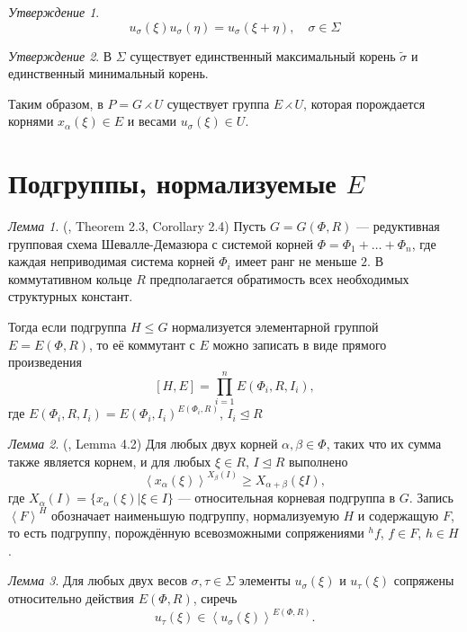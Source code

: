 \documentclass[10pt]{article}
\theoremstyle{remark}
\newtheorem{prop}{Утверждение}
\newtheorem{lm}{Лемма}
\renewcommand{\le}{\leqslant}
\renewcommand{\ge}{\geqslant}
\begin{document}
\begin{prop}
  $$ u_\sigma(\xi) u_\sigma(\eta) = u_\sigma(\xi + \eta), \quad \sigma \in \Sigma $$
\end{prop}

\begin{prop}
  В $\Sigma$ существует единственный максимальный корень $\widetilde{\sigma}$ и единственный минимальный корень.
\end{prop}

Таким образом, в $P = G \rightthreetimes U $ существует группа $E \rightthreetimes U$, которая порождается корнями $x_\alpha(\xi) \in E$ и весами $u_\sigma(\xi) \in U$.

\section{Подгруппы, нормализуемые $E$}

\begin{lm}(\citep{Stavrova2009}, Theorem 2.3, Corollary 2.4)
  \label{directproduct}
  Пусть $G = G(\Phi, R)$ --- редуктивная групповая схема Шевалле-Демазюра
  с системой корней $\Phi = \Phi_1 + \ldots + \Phi_n$, где каждая неприводимая система корней $\Phi_i$ имеет ранг не меньше $2$. В коммутативном кольце $R$ предполагается обратимость всех необходимых структурных констант.
  
  Тогда если подгруппа $H \le G$ нормализуется элементарной группой $E = E(\Phi,R)$, то её коммутант с $E$ можно записать в виде прямого произведения
  $$ [H, E] = \prod_{i=1}^n E(\Phi_i,R,I_i), $$
  где $E(\Phi_i,R,I_i) = E(\Phi_i,I_i)^{E(\Phi_i,R)}$, $I_i \trianglelefteq R$
\end{lm}

\begin{lm}(\citep{Stavrova2009}, Lemma 4.2)
  \label{transitivity}
  Для любых двух корней $\alpha, \beta \in \Phi$, таких что их сумма также является корнем, и для любых  $\xi \in R$, $I \trianglelefteq R$ выполнено
  $$ \left< x_\alpha(\xi) \right>^{X_\beta(I)} \ge X_{\alpha + \beta}(\xi I), $$  
  где $X_\alpha(I) = \{x_\alpha(\xi) | \xi \in I\}$ --- относительная корневая подгруппа в $G$. Запись $\left<F\right>^H$ обозначает наименьшую подгруппу, нормализуемую $H$ и содержащую $F$, то есть подгруппу, порождённую всевозможными сопряжениями $^hf$, $f \in F$, $h \in H$.
\end{lm}

\begin{lm}\label{unipotenttransitivity}
  Для любых двух весов $\sigma, \tau \in \Sigma$ элементы $u_\sigma(\xi)$ и $u_\tau(\xi)$ сопряжены относительно действия $E(\Phi,R)$, сиречь  
  $$ u_\tau(\xi) \in \left<u_\sigma(\xi)\right>^{E(\Phi,R)}. $$
\end{lm}
\end{document}

